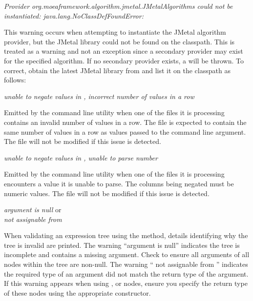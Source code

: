 \noindent
\textit{Provider org.moeaframework.algorithm.jmetal.JMetalAlgorithms could not be instantiated: java.lang.NoClassDefFoundError: }
\begin{indented}
  This warning occurs when attempting to instantiate the JMetal algorithm provider, but the JMetal library could not be found on the classpath.  This is treated as a warning and not an exception since a secondary provider may exist for the specified algorithm.  If no secondary provider exists, a  will be thrown.  To correct, obtain the latest JMetal library from  and list it on the  classpath as follows:
  \begin{indented}
  \end{indented}
\end{indented}
    
\noindent
\textit{unable to negate values in , incorrect number of values in a row}
\begin{indented}
  Emitted by the  command line utility when one of the files it is processing contains an invalid number of values in a row.  The file is expected to contain the same number of values in a row as values passed to the  command line argument.  The file will not be modified if this issue is detected.
\end{indented}

\noindent
\textit{unable to negate values in , unable to parse number}
\begin{indented}
  Emitted by the  command line utility when one of the files it is processing encounters a value it is unable to parse.  The columns being negated must be numeric values.  The file will not be modified if this issue is detected.
\end{indented}

\noindent
\textit{argument is null} or\\
\textit{ not assignable from }
\begin{indented}
  When validating an expression tree using the  method, details identifying why the tree is invalid are printed.  The warning ``argument is null'' indicates the tree is incomplete and contains a missing argument. Check to ensure all arguments of all nodes within the tree are non-null. The warning `` not assignable from '' indicates the required type of an argument did not match the return type of the argument.  If this warning appears when using ,  or  nodes, ensure you specify the return type of these nodes using the appropriate constructor.
\end{indented}